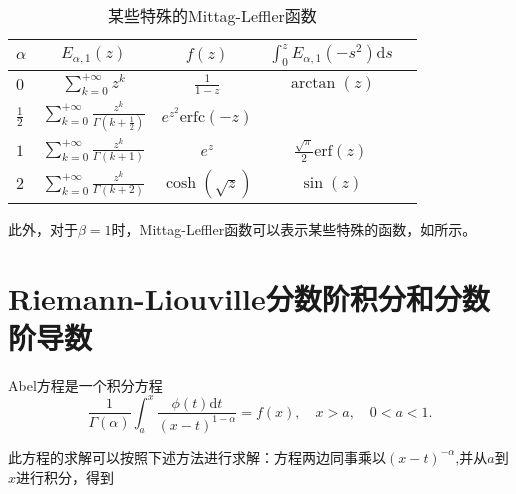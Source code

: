 \begin{property}
\begin{enumerate}[noitemsep]
		\begin{table}[htbp]
			\centering\makegapedcells
			\caption{某些特殊的Mittag-Leffler函数}
			\setlength{\tabcolsep}{7mm}
			\label{tab:Table2-1-1}
			\begin{tabular}{l*{4}{c}}
				\toprule
				$ \alpha$  & $ \displaystyle E_{\alpha,1}\left(z\right)$  & $ \displaystyle f\left(z\right)$   & $ \displaystyle \int_{0}^{z}{E_{\alpha,1}\left(-s^2\right)} {\mathrm{d}s}$ \\
				\midrule
				$\displaystyle 0$   & $ \displaystyle \sum _{{k=0}}^{+\infty }z^{k}  $  & $\displaystyle \frac{1}{1-z}$       & $ \arctan\left(z\right)$ \\
				$ \displaystyle \frac{1}{2}$ & $\displaystyle \sum _{k=0}^{+\infty }{\frac{z^{k}}{\Gamma\left(k+\frac{1}{2}\right)}}$  & $\displaystyle e^{z^2} \mathrm{erfc}\left(-z\right)$ &   \\   	
				$\displaystyle 1$   & $\displaystyle \sum _{k=0}^{+\infty }{\frac{z^{k}}{\Gamma\left(k+1\right)}}$   & $\displaystyle e^{z}$  & $ \displaystyle \frac{\sqrt{\pi}}{2}\mathrm{erf}\left(z\right)$  \\    
				$2$    & $\displaystyle \sum _{k=0}^{+\infty }{\frac{z^{k}}{\Gamma\left(k+2\right)}}$    & $ \displaystyle \cosh\left(\sqrt{z}\right) $ & $\displaystyle {\sin}\left(z\right)$     \\
				\bottomrule
			\end{tabular}
		\end{table}
		
		此外，对于$\beta = 1$时，Mittag-Leffler函数可以表示某些特殊的函数，如所示。
		
	\end{enumerate}
\end{property}

\section{Riemann-Liouville分数阶积分和分数阶导数}

Abel方程是一个积分方程  
\begin{equation}
\frac{1}{\Gamma\left(\alpha\right)} \int_{a}^{x} \frac{\phi\left(t\right)\mathrm{d}t}{\left(x-t\right)^{1-\alpha}}=f\left(x\right),\quad x>a,\quad 0<a<1.
\end{equation}

此方程的求解可以按照下述方法进行求解：方程两边同事乘以$\left(x-t\right)^{-\alpha}$,并从$a$到$x$进行积分，得到







